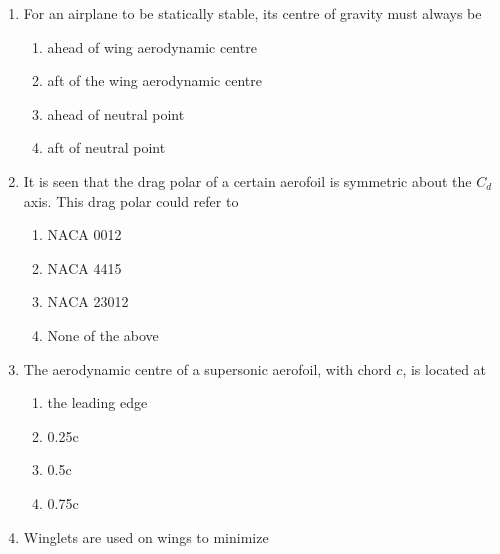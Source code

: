 \documentclass[journal]{IEEEtran}
\begin{document}
\begin{enumerate}[start=14]
\begin{multicols}{1}
    \begin{enumerate}
        \item is always zero
        \item is never zero
        \item is always negative
        \item could be any value
    \end{enumerate}
\end{multicols}
\item For an airplane to be statically stable, its centre of gravity must always be
 \begin{multicols}{2}
    \begin{enumerate}
        \item ahead of wing aerodynamic centre
        \item aft of the wing aerodynamic centre
        \item ahead of neutral point
        \item aft of neutral point
    \end{enumerate}
\end{multicols} 
 \item  It is seen that the drag polar of a certain aerofoil is symmetric about the $ C_{d} $ axis. This drag polar could refer to
 \begin{multicols}{1}
    \begin{enumerate}
        \item NACA 0012
        \item NACA 4415
        \item NACA 23012
        \item None of the above
    \end{enumerate}
\end{multicols}
\item The aerodynamic centre of a supersonic aerofoil, with chord $ c $, is located at
 \begin{multicols}{1}
    \begin{enumerate}
        \item the leading edge
        \item 0.25c 
        \item 0.5c 
        \item 0.75c 
    \end{enumerate}
\end{multicols}
\item Winglets are used on wings to minimize
 \begin{multicols}{1}
    \begin{enumerate}

\end{enumerate}
\end{multicols}
\end{enumerate}
\end{document}
